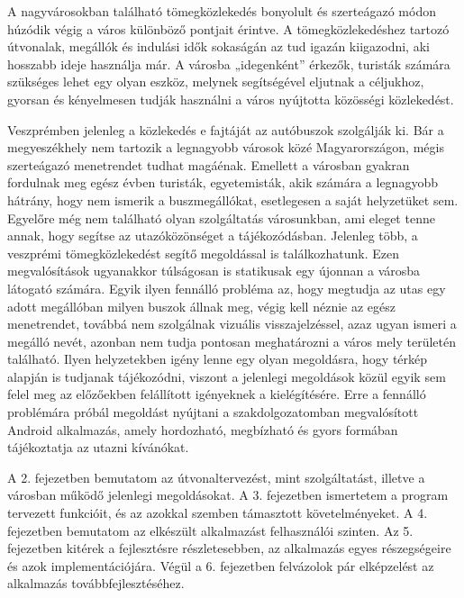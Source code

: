 
A nagyvárosokban található tömegközlekedés bonyolult és szerteágazó módon húzódik végig a város különböző pontjait érintve. 
A tömegközlekedéshez tartozó útvonalak, megállók és indulási idők sokaságán az tud igazán kiigazodni, aki hosszabb ideje használja már. 
A városba „idegenként” érkezők, turisták számára szükséges lehet egy olyan eszköz, melynek segítségével eljutnak a céljukhoz, gyorsan és kényelmesen tudják használni a város nyújtotta közösségi közlekedést. 

Veszprémben jelenleg a közlekedés e fajtáját az autóbuszok szolgálják ki. 
Bár a megyeszékhely nem tartozik a legnagyobb városok közé Magyarországon, mégis szerteágazó menetrendet tudhat magáénak. 
Emellett a városban gyakran fordulnak meg egész évben turisták, egyetemisták, akik számára a legnagyobb hátrány, hogy nem ismerik a buszmegállókat, esetlegesen a saját helyzetüket sem. 
Egyelőre még nem található olyan szolgáltatás városunkban, ami eleget tenne annak, hogy segítse az utazóközönséget a tájékozódásban.
Jelenleg több, a veszprémi tömegközlekedést segítő megoldással is találkozhatunk. 
Ezen megvalósítások ugyanakkor túlságosan is statikusak egy újonnan a városba látogató számára. 
Egyik ilyen fennálló probléma az, hogy megtudja az utas egy adott megállóban milyen buszok állnak meg, végig kell néznie az egész menetrendet, továbbá nem szolgálnak vizuális visszajelzéssel, azaz ugyan ismeri a megálló nevét, azonban nem tudja pontosan meghatározni a város mely területén található. 
Ilyen helyzetekben igény lenne egy olyan megoldásra, hogy térkép alapján is tudjanak tájékozódni, viszont a jelenlegi megoldások közül egyik sem felel meg az előzőekben felállított igényeknek a kielégítésére.
Erre a fennálló problémára próbál megoldást nyújtani a szakdolgozatomban megvalósított Android alkalmazás, amely hordozható, megbízható és gyors formában tájékoztatja az utazni kívánókat. 

A 2. fejezetben bemutatom az útvonaltervezést, mint szolgáltatást, illetve a városban működő jelenlegi megoldásokat. 
A 3. fejezetben ismertetem a program tervezett funkcióit, és az azokkal szemben támasztott követelményeket.
A 4. fejezetben bemutatom az elkészült alkalmazást felhasználói szinten.
Az 5. fejezetben kitérek a fejlesztésre részletesebben, az alkalmazás egyes részegségeire és azok implementációjára. 
Végül a 6. fejezetben felvázolok pár elképzelést az alkalmazás továbbfejlesztéséhez.
\newpage